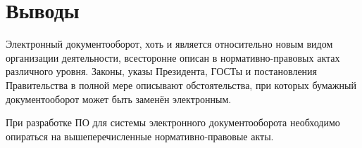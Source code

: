 \section{Выводы} \label{rights_conclusion}

Электронный документооборот, хоть и является относительно новым видом организации деятельности, всесторонне описан в нормативно-правовых актах различного уровня. Законы, указы Президента, ГОСТы и постановления Правительства в полной мере описывают обстоятельства, при которых бумажный документооборот может быть заменён электронным.

\vspace{\baselineskip}
При разработке ПО для системы электронного документооборота необходимо опираться на вышеперечисленные нормативно-правовые акты.